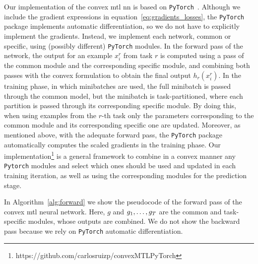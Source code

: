 Our implementation of the convex \acrshort{mtl} \acrshort{nn} is based on \texttt{PyTorch}~\citep{PyTorch}.
Although we include the gradient expressions in equation~\eqref{eq:gradients_losses}, the \texttt{PyTorch} package implements automatic differentiation, so we do not have to explicitly implement the gradients.
Instead, we implement each network, common or specific, using (possibly different) \texttt{PyTorch} modules.
In the forward pass of the network, the output for an example $x_i^r$ from task $r$ is computed using a pass of the common module and the corresponding specific module, and combining both passes with the convex formulation to obtain the final output $h_r(x_i^r)$.
In the training phase, in which minibatches are used, the full minibatch is passed through the common model, but the minibatch is task-partitioned, where each partition is passed through its corresponding specific module.
By doing this, when using examples from the $r$-th task only the parameters corresponding to the common module and its corresponding specific one are updated.
Moreover, as mentioned above, with the adequate forward pass, the \texttt{PyTorch} package automatically computes the scaled gradients in the training phase.
Our implementation\footnote{https://github.com/carlosruizp/convexMTLPyTorch} is a general framework to combine in a convex manner any \texttt{Pytorch} modules and select which ones should be used and updated in each training iteration, as well as using the corresponding modules for the prediction stage.


{In Algorithm~\ref{alg:forward} we show the pseudocode of the forward pass of the convex \acrshort{mtl} neural network. Here, $g$ and $g_1, \ldots, g_T$ are the common and task-specific modules, whose outputs are combined. We do not show the backward pass because we rely on \texttt{PyTorch} automatic differentiation.}



















